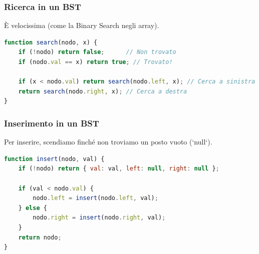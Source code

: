 \subsubsection{Ricerca in un BST}
È velocissima (come la Binary Search negli array).
\begin{lstlisting}[language=JavaScript]
function search(nodo, x) {
    if (!nodo) return false;      // Non trovato
    if (nodo.val == x) return true; // Trovato!
    
    if (x < nodo.val) return search(nodo.left, x); // Cerca a sinistra
    return search(nodo.right, x); // Cerca a destra
}
\end{lstlisting}

\subsubsection{Inserimento in un BST}
Per inserire, scendiamo finché non troviamo un posto vuoto (`null`).
\begin{lstlisting}[language=JavaScript]
function insert(nodo, val) {
    if (!nodo) return { val: val, left: null, right: null };
    
    if (val < nodo.val) {
        nodo.left = insert(nodo.left, val);
    } else {
        nodo.right = insert(nodo.right, val);
    }
    return nodo;
}
\end{lstlisting}
